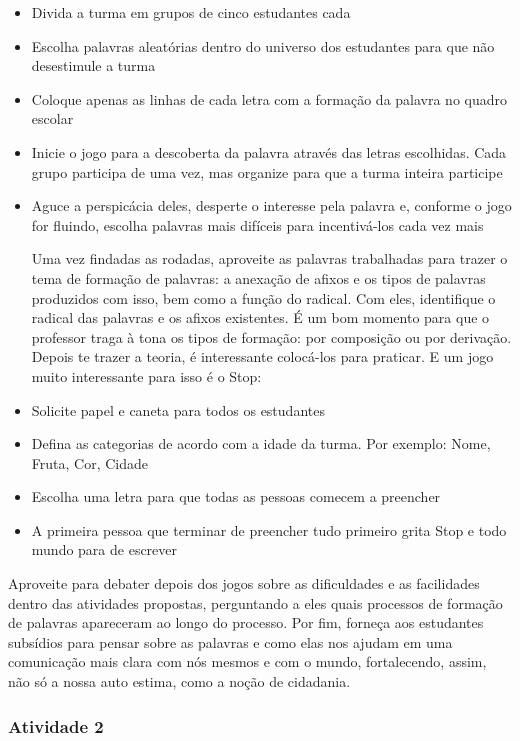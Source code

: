 \documentclass[11pt]{extarticle}
\begin{document}
\begin{itemize}
\item Divida a turma em grupos de cinco estudantes cada
\item Escolha palavras aleatórias dentro do universo dos estudantes para que não desestimule a turma
\item Coloque apenas as linhas de cada letra com a formação da palavra no quadro escolar
\item Inicie o jogo para a descoberta da palavra através das letras escolhidas. Cada grupo participa de uma vez, mas organize para que a turma inteira participe
\item Aguce a perspicácia deles, desperte o interesse pela palavra e, conforme o jogo for fluindo, escolha palavras mais difíceis para incentivá-los cada vez mais

Uma vez findadas as rodadas, aproveite as palavras trabalhadas para trazer o tema de formação de palavras: a anexação de afixos e os tipos de palavras produzidos com isso, bem como a função do radical. Com eles, identifique o radical das palavras e os afixos existentes. É um bom momento para que o professor traga à tona os tipos de formação: por composição ou por derivação. Depois te trazer a teoria, é interessante colocá-los para praticar. E um jogo muito interessante para isso é o Stop:

\item Solicite papel e caneta para todos os estudantes
\item Defina as categorias de acordo com a idade da turma. Por exemplo: Nome, Fruta, Cor, Cidade
\item Escolha uma letra para que todas as pessoas comecem a preencher
\item A primeira pessoa que terminar de preencher tudo primeiro grita Stop e todo mundo para de escrever
\end{itemize}

Aproveite para debater depois dos jogos sobre as dificuldades e as facilidades dentro das atividades propostas, perguntando a eles quais processos de formação de palavras apareceram ao longo do processo. Por fim, forneça aos estudantes subsídios para pensar sobre as palavras e como elas nos ajudam em uma comunicação mais clara com nós mesmos e com o mundo, fortalecendo, assim, não só a nossa auto estima, como a noção de cidadania.

\subsubsection{Atividade 2}
\end{document}
